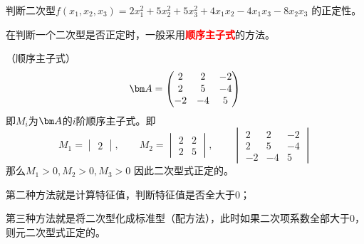\begin{example}
    判断二次型$f(x_1,x_2,x_3)=2x_1^2 + 5x_2^2 + 5x_3^2 + 4x_1x_2 - 4x_1x_3 - 8x_2x_3$
    的正定性。
\end{example}
在判断一个二次型是否正定时，一般采用\textcolor{red}{\textbf{\textsf{顺序主子式}}}的方法。
\begin{solution}
    （顺序主子式）
    \[
        \mat{A} =
        \begin{pmatrix}
            2  & 2  & -2 \\
            2  & 5  & -4 \\
            -2 & -4 & 5
        \end{pmatrix}
    \]
    即$M_i$为$\mat{A}$的$i$阶顺序主子式。即
    \[
        M_1 =
        \begin{vmatrix}
            2
        \end{vmatrix},\qquad
        M_2 =
        \begin{vmatrix}
            2 & 2 \\
            2 & 5
        \end{vmatrix},\qquad
        \begin{vmatrix}
            2  & 2  & -2 \\
            2  & 5  & -4 \\
            -2 & -4 & 5
        \end{vmatrix}
    \]
    那么$M_1 > 0, M_2>0, M_3>0$
    因此二次型式正定的。
\end{solution}

第二种方法就是计算特征值，判断特征值是否全大于$0$；

第三种方法就是将二次型化成标准型（配方法），此时如果二次项系数全部大于$0$，则元二次型式正定的。

